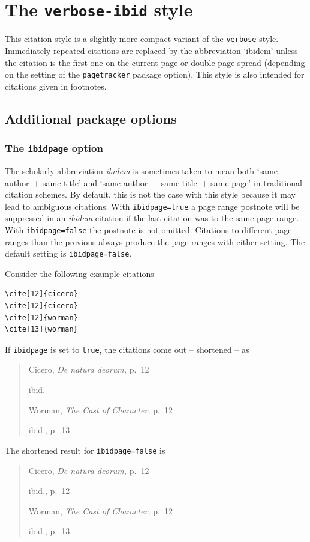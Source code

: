 \documentclass[a4paper]{article}
\begin{document}
\section*{The \texttt{verbose-ibid} style}

This citation style is a slightly more compact variant of the
\texttt{verbose} style. Immediately repeated citations are replaced
by the abbreviation `ibidem' unless the citation is the first one on
the current page or double page spread (depending on the setting of
the \texttt{pagetracker} package option). This style is also
intended for citations given in footnotes.

\subsection*{Additional package options}

\subsubsection*{The \texttt{ibidpage} option}

The scholarly abbreviation \emph{ibidem} is sometimes taken to mean
both `same author~+ same title' and `same author~+ same title~+ same
page' in traditional citation schemes. By default, this is not the
case with this style because it may lead to ambiguous citations.
With \texttt{ibidpage=true} a page range postnote will be suppressed
in an \emph{ibidem} citation if the last citation was to the same
page range. With \texttt{ibidpage=false} the postnote is not omitted.
Citations to different page ranges than the previous always produce
the page ranges with either setting.
The default setting is \texttt{ibidpage=false}.

Consider the following example citations
\begin{verbatim}
\cite[12]{cicero}
\cite[12]{cicero}
\cite[12]{worman}
\cite[13]{worman}
\end{verbatim}
%
If \texttt{ibidpage} is set to \texttt{true}, the citations
come out -- shortened -- as
\begin{quote}
Cicero, \emph{De natura deorum,} p.~12

ibid.

Worman, \emph{The Cast of Character,} p.~12

ibid., p.~13
\end{quote}
%
The shortened result for \texttt{ibidpage=false} is
\begin{quote}
Cicero, \emph{De natura deorum,} p.~12

ibid., p.~12

Worman, \emph{The Cast of Character,} p.~12

ibid., p.~13
\end{quote}
\end{document}
